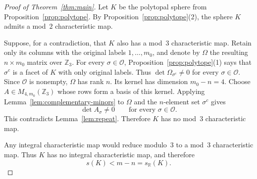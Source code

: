 \documentclass[10pt,a4paper]{amsart}
\theoremstyle{plain}
\numberwithin{equation}{section}
\theoremstyle{remark}
\theoremstyle{definition}
\newcommand{\Z}{\mathbb Z}
\newcommand{\cO}{\mathcal O}
\newcommand{\R}{\mathbb R}
\begin{document}
\begin{proof}[Proof of Theorem~\ref{thm:main}]
    Let $K$ be the polytopal sphere from Proposition~\ref{prop:polytope}.
    By Proposition~\ref{prop:polytope}(2), the sphere $K$ admits a mod~$2$ characteristic map.
    
    Suppose, for a contradiction, that $K$ also has a mod~$3$ characteristic map.
    Retain only its columns with the original labels $1,\ldots,m_0$, and denote by $\Omega$ the resulting $n\times m_0$ matrix over $\Z_3$.
    For every $\sigma\in\cO$, Proposition~\ref{prop:polytope}(1) says that $\sigma^c$ is a facet of $K$ with only original labels.
    Thus $\det\Omega_{\sigma^c}\ne0$ for every $\sigma\in\cO$.
    Since $\cO$ is nonempty, $\Omega$ has rank $n$.
    Its kernel has dimension $m_0-n=4$.
    Choose $A\in M_{4,m_0}(\Z_3)$ whose rows form a basis of this kernel.
    Applying Lemma~\ref{lem:complementary-minors} to $\Omega$ and the $n$-element set $\sigma^c$ gives
    $$
        \det A_\sigma\ne0 \qquad\text{for every }\sigma\in\cO.
    $$
    This contradicts Lemma~\ref{lem:repeat}.
    Therefore $K$ has no mod~$3$ characteristic map.
    
    Any integral characteristic map would reduce modulo~$3$ to a mod~$3$ characteristic map.
    Thus $K$ has no integral characteristic map, and therefore
    $$
        s(K)<m-n=s_{\R}(K).
    $$
\end{proof}
\end{document}
